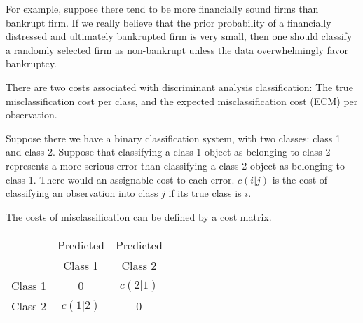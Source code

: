 \begin{frame}
For example, suppose there tend to be more financially sound firms than bankrupt
firm. If we really believe that the prior probability of a financially
distressed and ultimately bankrupted firm is very small, then one should
classify a randomly selected firm as non-bankrupt unless the data
overwhelmingly favor bankruptcy.
\end{frame}
\begin{frame}


There are two costs associated with discriminant analysis classification: The true misclassification cost per class, and the expected misclassification cost (ECM) per observation.

Suppose there we have a binary classification system, with two classes: class 1 and class 2.
Suppose that classifying a class 1 object as belonging to class 2 represents a more serious error than classifying a class 2 object as belonging to class 1. There would an assignable cost to each error.
$c(i|j)$ is the cost of classifying an observation into class $j$ if its true class is $i$.
\end{frame}
\begin{frame}

The costs of misclassification can be defined by a cost matrix.

\begin{tabular}{|c|c|c|}
  \hline
  & Predicted & Predicted \\
   & Class 1 & Class 2 \\  \hline
  Class 1 & 0 & $c(2|1)$  \\
  Class 2 & $c(1|2)$ & 0 \\
  \hline
\end{tabular}

\end{frame}
